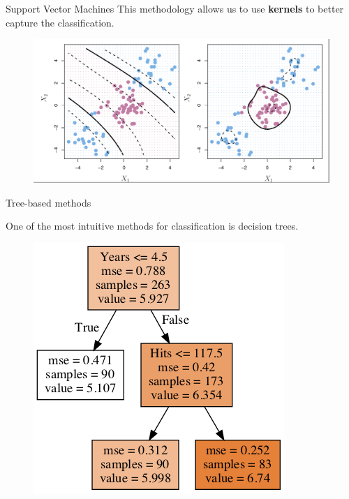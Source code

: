 \documentclass{beamer}
\begin{document}
\begin{frame}{Support Vector Machines}
	This methodology allows us to use \textbf{kernels} to better capture the classification.
\begin{figure}[h]
	\centering
	\includegraphics[scale=0.25]{Figures/fig_kernels_svm.png}
\end{figure}		
	

\end{frame}

\begin{frame}{Tree-based methods}

One of the most intuitive methods for classification is decision trees. 
\begin{figure}[h]
	\centering
	\includegraphics[scale=0.45]{Figures/fig_hitters.png}
\end{figure}		

\end{frame}
\end{document}
